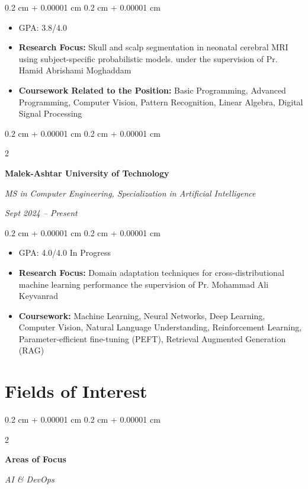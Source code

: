 \documentclass[10pt, letterpaper]{article}
\newenvironment{highlights}{
    \begin{itemize}[
        topsep=0.10 cm,
        parsep=0.10 cm,
        partopsep=0pt,
        itemsep=0pt,
        leftmargin=0.4 cm + 10pt
    ]
}{
    \end{itemize}
} %
\newenvironment{onecolentry}{
    \begin{adjustwidth}{
        0.2 cm + 0.00001 cm
    }{
        0.2 cm + 0.00001 cm
    }
}{
    \end{adjustwidth}
} %
\newenvironment{twocolentry}[2][]{
    \onecolentry
    \def\secondColumn{#2}
    \setcolumnwidth{\fill, 5.5 cm}
    \begin{paracol}{2}
}{
    \switchcolumn \raggedleft \secondColumn
    \end{paracol}
    \endonecolentry
} %
\let\hrefWithoutArrow\href
\renewcommand{\href}[2]{\hrefWithoutArrow{#1}{\ifthenelse{\equal{#2}{}}{ }{#2 }\raisebox{.15ex}{\footnotesize \faExternalLink*}}}
\begin{document}
        \vspace{0.10 cm}
        \begin{onecolentry}
            \begin{highlights}
                \item GPA: 3.8/4.0 
                \item \textbf{Research Focus:} Skull and scalp segmentation in neonatal cerebral MRI using subject-specific probabilistic models. under the supervision of Pr. Hamid Abrishami Moghaddam

                \item \textbf{Coursework Related to the Position:} Basic Programming, Advanced Programming, Computer Vision, Pattern Recognition, Linear Algebra, Digital Signal Processing 
            \end{highlights}
        \end{onecolentry}


        \begin{twocolentry}{
		\textit{Sept 2024 – Present}}
			\textbf{Malek-Ashtar University of Technology}
			
			\textit{MS in Computer Engineering, Specialization in Artificial Intelligence}
		\end{twocolentry}
		
		\vspace{0.10 cm}
		\begin{onecolentry}
			\begin{highlights}
				\item GPA: 4.0/4.0 \hfill \small{In Progress}
                \item \textbf{Research Focus:} Domain adaptation techniques for cross-distributional machine learning performance the supervision of Pr. Mohammad Ali Keyvanrad				
				\item \textbf{Coursework:} Machine Learning, Neural Networks, Deep Learning, Computer Vision, Natural Language Understanding, Reinforcement Learning, Parameter-efficient fine-tuning (PEFT), Retrieval Augmented Generation (RAG)
			\end{highlights}
		\end{onecolentry}
    
	\section{Fields of Interest}

		\begin{twocolentry}{
				\textit{AI \& DevOps}    
				
			}
			\textbf{Areas of Focus}
			
		\end{twocolentry}
		
\end{document}
